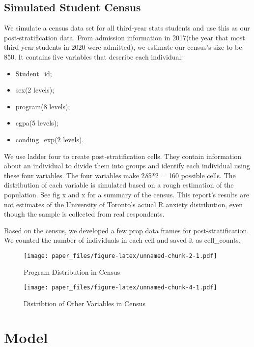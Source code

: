 \documentclass[
]{article}
\providecommand{\tightlist}{%
  \setlength{\itemsep}{0pt}\setlength{\parskip}{0pt}}
\begin{document}
\hypertarget{simulated-student-census}{%
\subsection{Simulated Student Census}\label{simulated-student-census}}

We simulate a census data set for all third-year stats students and use
this as our post-stratification data. From admission information in
2017(the year that most third-year students in 2020 were admitted), we
estimate our census's size to be 850. It contains five variables that
describe each individual:

\begin{itemize}
\tightlist
\item
  Student\_id;
\item
  sex(2 levels);
\item
  program(8 levels);
\item
  cgpa(5 levels);
\item
  conding\_exp(2 levels).
\end{itemize}

We use ladder four to create post-stratification cells. They contain
information about an individual to divide them into groups and identify
each individual using these four variables. The four variables make
2\emph{8}5*2 = 160 possible cells. The distribution of each variable is
simulated based on a rough estimation of the population. See fig x and x
for a summary of the census. This report's results are not estimates of
the University of Toronto's actual R anxiety distribution, even though
the sample is collected from real respondents.

Based on the census, we developed a few prop data frames for
post-stratification. We counted the number of individuals in each cell
and saved it as cell\_counts.

\begin{figure}
\centering
\texttt{[image: paper\_files/figure-latex/unnamed-chunk-2-1.pdf]}
\caption{Program Distribution in Census}
\end{figure}

\begin{figure}
\centering
\texttt{[image: paper\_files/figure-latex/unnamed-chunk-4-1.pdf]}
\caption{Distribtion of Other Variables in Census}
\end{figure}

\hypertarget{model}{%
\section{Model}\label{model}}
\end{document}
